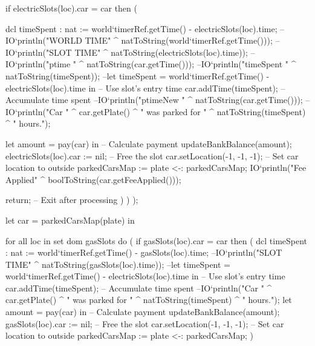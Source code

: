 \documentclass[a4paper]{article}
\begin{document}
\begin{vdm_al}
                if electricSlots(loc).car = car then
                (   
                    
                    dcl timeSpent : nat := world`timerRef.getTime() - electricSlots(loc).time;
                    --IO`println("WORLD TIME" ^ natToString(world`timerRef.getTime()));
                    --IO`println("SLOT TIME" ^ natToString(electricSlots(loc).time));
                    --IO`println("ptime " ^ natToString(car.getTime()));
                    --IO`println("timeSpent " ^ natToString(timeSpent));
                    --let timeSpent = world`timerRef.getTime() - electricSlots(loc).time in  -- Use slot's entry time
                    car.addTime(timeSpent);  -- Accumulate time spent
                    --IO`println("ptimeNew " ^ natToString(car.getTime()));
                    --IO`println("Car " ^ car.getPlate() ^ " was parked for " ^ natToString(timeSpent) ^ " hours.");
                    
                    
                    let amount = pay(car) in  -- Calculate payment
                    updateBankBalance(amount);
                    electricSlots(loc).car := nil;  -- Free the slot
                    car.setLocation(-1, -1, -1);  -- Set car location to outside
                    parkedCarsMap := {plate} <-: parkedCarsMap;
                    IO`println("Fee Applied" ^ boolToString(car.getFeeApplied()));

                    return;  -- Exit after processing
                )
            )
        );
        
        let car = parkedCarsMap(plate) in

            for all loc in set dom gasSlots do
            (
                if gasSlots(loc).car = car then
                (
                    dcl timeSpent : nat := world`timerRef.getTime() - gasSlots(loc).time;
                    --IO`println("SLOT TIME" ^ natToString(gasSlots(loc).time));
                    --let timeSpent = world`timerRef.getTime() - electricSlots(loc).time in  -- Use slot's entry time
                    car.addTime(timeSpent);  -- Accumulate time spent
                    --IO`println("Car " ^ car.getPlate() ^ " was parked for " ^ natToString(timeSpent) ^ " hours.");
                    let amount = pay(car) in  -- Calculate payment
                    updateBankBalance(amount);
                    gasSlots(loc).car := nil;  -- Free the slot
                    car.setLocation(-1, -1, -1);  -- Set car location to outside
                    parkedCarsMap := {plate} <-: parkedCarsMap;
                )
                

\end{vdm_al}
\end{document}
